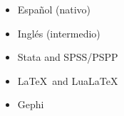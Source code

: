 




\twocolumnsection
{
\begin{itemize}
\vspace{1em}
	\item Español (nativo)
	\item Inglés (intermedio)
\end{itemize}}
{
\vspace{1em}
\begin{itemize}
	\item Stata and SPSS/PSPP
	\item \LaTeX\ and Lua\LaTeX\
    \item Gephi
\end{itemize}
}
\\